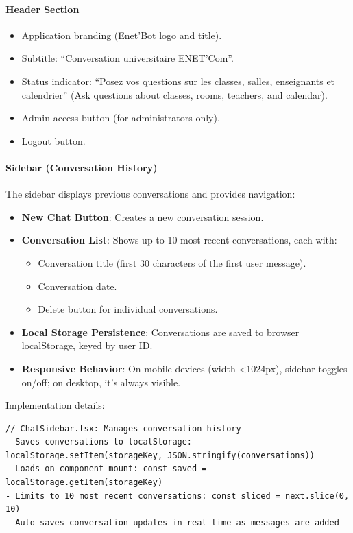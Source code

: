 \paragraph{Header Section}
\begin{itemize}
    \item Application branding (Enet'Bot logo and title).
    \item Subtitle: ``Conversation universitaire ENET'Com''.
    \item Status indicator: ``Posez vos questions sur les classes, salles, enseignants et calendrier'' (Ask questions about classes, rooms, teachers, and calendar).
    \item Admin access button (for administrators only).
    \item Logout button.
\end{itemize}

\paragraph{Sidebar (Conversation History)}
The sidebar displays previous conversations and provides navigation:

\begin{itemize}
    \item \textbf{New Chat Button}: Creates a new conversation session.
    \item \textbf{Conversation List}: Shows up to 10 most recent conversations, each with:
    \begin{itemize}
        \item Conversation title (first 30 characters of the first user message).
        \item Conversation date.
        \item Delete button for individual conversations.
    \end{itemize}
    \item \textbf{Local Storage Persistence}: Conversations are saved to browser localStorage, keyed by user ID.
    \item \textbf{Responsive Behavior}: On mobile devices (width \textless 1024px), sidebar toggles on/off; on desktop, it's always visible.
\end{itemize}

Implementation details:

\begin{verbatim}
// ChatSidebar.tsx: Manages conversation history
- Saves conversations to localStorage: localStorage.setItem(storageKey, JSON.stringify(conversations))
- Loads on component mount: const saved = localStorage.getItem(storageKey)
- Limits to 10 most recent conversations: const sliced = next.slice(0, 10)
- Auto-saves conversation updates in real-time as messages are added
\end{verbatim}

